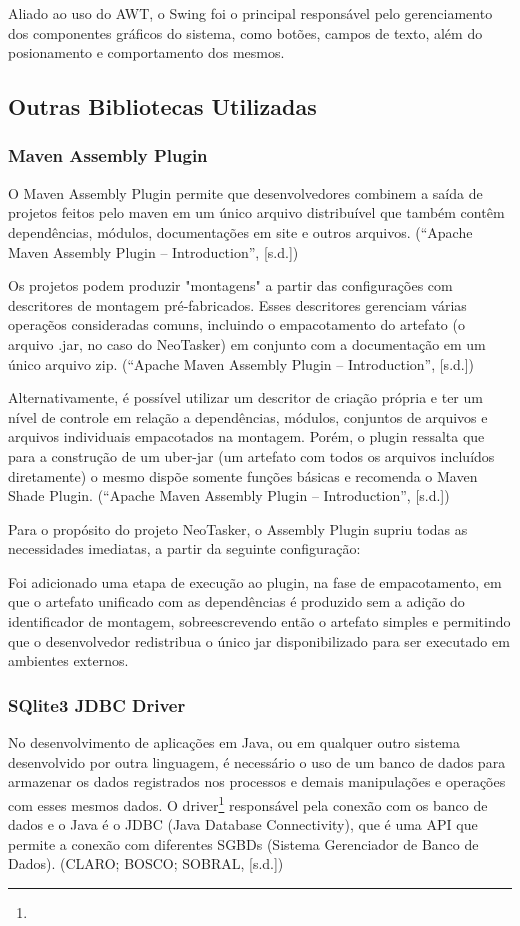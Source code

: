 \documentclass[a4paper,12pt]{article}
\begin{document}
Aliado ao uso do AWT, o Swing foi o principal responsável pelo gerenciamento dos componentes gráficos do sistema, como botões, campos de texto, além 
do posionamento e comportamento dos mesmos. 


\subsection{Outras Bibliotecas Utilizadas}
\subsubsection{Maven Assembly Plugin}
O Maven Assembly Plugin permite que desenvolvedores combinem a saída de projetos feitos pelo maven em um único arquivo distribuível que também 
contêm dependências, módulos, documentações em site e outros arquivos. (“Apache Maven Assembly Plugin – Introduction”, [s.d.])

Os projetos podem produzir "montagens" a partir das configurações com descritores de montagem pré-fabricados. Esses descritores gerenciam 
várias operaçẽos consideradas comuns, incluindo o empacotamento do artefato (o arquivo .jar, no caso do NeoTasker) em conjunto com a 
documentação em um único arquivo zip. (“Apache Maven Assembly Plugin – Introduction”, [s.d.])

Alternativamente, é possível utilizar um descritor de criação própria e ter um nível de controle em relação a dependências, módulos, 
conjuntos de arquivos e arquivos individuais empacotados na montagem. Porém, o plugin ressalta que para a construção de um uber-jar 
(um artefato com todos os arquivos incluídos diretamente) o mesmo dispõe somente funções básicas e recomenda o Maven Shade Plugin. (“Apache Maven Assembly Plugin – Introduction”, [s.d.])

Para o propósito do projeto NeoTasker, o Assembly Plugin supriu todas as necessidades imediatas, a partir da seguinte configuração:

Foi adicionado uma etapa de execução ao plugin, na fase de empacotamento, em que o artefato unificado com as dependências é produzido 
sem a adição do identificador de montagem, sobreescrevendo então o artefato simples e permitindo que o desenvolvedor redistribua o 
único jar disponibilizado para ser executado em ambientes externos.

\subsubsection{SQlite3 JDBC Driver}
No desenvolvimento de aplicações em Java, ou em qualquer outro sistema desenvolvido por outra linguagem, é necessário o uso de um banco de dados para armazenar os dados 
registrados nos processos e demais manipulações e operações com esses mesmos dados. O driver\footnote{

} responsável pela conexão com os banco de dados e o Java é o JDBC (Java Database Connectivity), que é uma API que permite a conexão com diferentes SGBDs (Sistema 
Gerenciador de Banco de Dados). (CLARO; BOSCO; SOBRAL, [s.d.])
\end{document}
